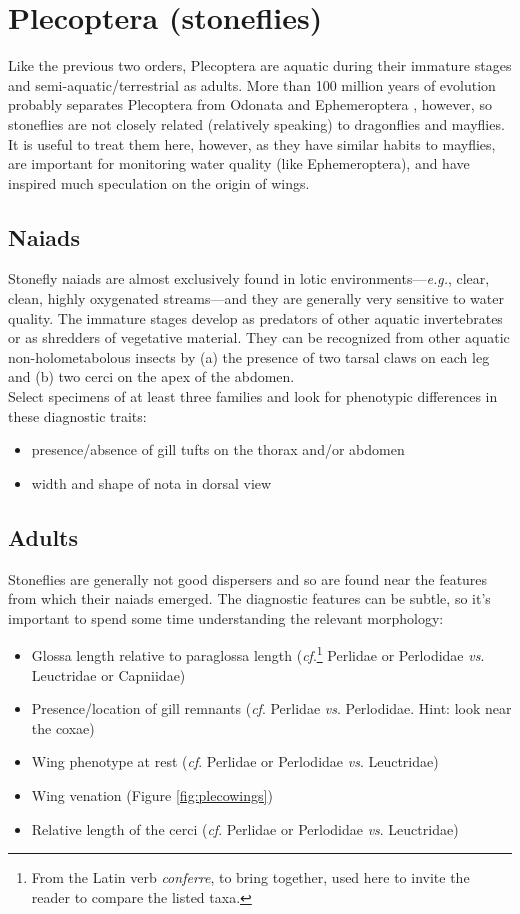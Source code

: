 \documentclass[letterpaper, 11pt]{article}
\begin{document}
\section{Plecoptera (stoneflies)}
Like the previous two orders, Plecoptera are aquatic during their immature stages and semi-aquatic/terrestrial as adults. More than 100 million years of evolution probably separates Plecoptera from Odonata and Ephemeroptera \citep{Misof763}, however, so stoneflies are not closely related (relatively speaking) to dragonflies and mayflies. It is useful to treat them here, however, as they have similar habits to mayflies, are important for monitoring water quality (like Ephemeroptera), and have inspired much speculation on the origin of wings.

\subsection*{Naiads}
Stonefly naiads are almost exclusively found in lotic environments---\textit{e.g.}, clear, clean, highly oxygenated streams---and they are generally very sensitive to water quality. The immature stages develop as predators of other aquatic invertebrates or as shredders of vegetative material. They can be recognized from other aquatic non-holometabolous insects by (a) the presence of two tarsal claws on each leg and (b) two cerci on the apex of the abdomen.\\

\noindent{}Select specimens of at least three families and look for phenotypic differences in these diagnostic traits:
\begin{itemize}
\item presence/absence of gill tufts on the thorax and/or abdomen
\item width and shape of nota in dorsal view
\end{itemize}

\subsection*{Adults}
Stoneflies are generally not good dispersers and so are found near the features from which their naiads emerged. The diagnostic features can be subtle, so it's important to spend some time understanding the relevant morphology:

\begin{itemize}
\item Glossa length relative to paraglossa length (\textit{cf}.\footnote{From the Latin verb \textit{conferre}, to bring together, used here to invite the reader to compare the listed taxa.} Perlidae or Perlodidae \textit{vs}. Leuctridae or Capniidae)
\item Presence/location of gill remnants (\textit{cf}. Perlidae \textit{vs}. Perlodidae. Hint: look near the coxae)
\item Wing phenotype at rest (\textit{cf}. Perlidae or Perlodidae \textit{vs}. Leuctridae)
\item Wing venation (Figure \ref{fig:plecowings})
\item Relative length of the cerci (\textit{cf}. Perlidae or Perlodidae \textit{vs}. Leuctridae)
\end{itemize}
\end{document}
